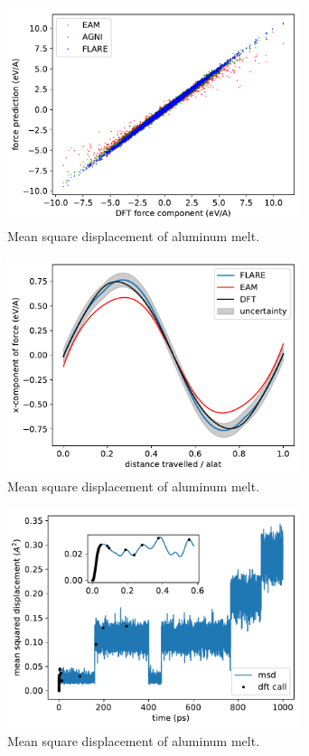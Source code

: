 \documentclass[%
reprint,
superscriptaddress,
amsmath,amssymb,
aps,
prl,
]{revtex4-1}
\begin{document}
\begin{figure}
	\centering
	\includegraphics[width=3.4in]{parity_liquid.pdf}
	\caption{Mean square displacement of aluminum melt.}
\end{figure}

\begin{figure}
	\centering
	\includegraphics[width=3.4in]{vacancy_act.pdf}
	\caption{Mean square displacement of aluminum melt.}
\end{figure}

\begin{figure}
	\centering
	\includegraphics[width=3.4in]{vacancy_msd.pdf}
	\caption{Mean square displacement of aluminum melt.}
\end{figure}
\end{document}
